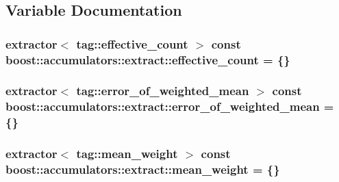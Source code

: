 \subsection{Variable Documentation}
\hypertarget{namespaceboost_1_1accumulators_1_1extract_a3053aac83dc8752f96916fe5b8d4ce31}{
\subsubsection[{effective\-\_\-count}]{\setlength{\rightskip}{0pt plus 5cm}extractor$<$ {\bf tag\-::effective\-\_\-count} $>$ const boost\-::accumulators\-::extract\-::effective\-\_\-count = \{\}}}\label{namespaceboost_1_1accumulators_1_1extract_a3053aac83dc8752f96916fe5b8d4ce31}
\hypertarget{namespaceboost_1_1accumulators_1_1extract_aa736c1893587667ab411a7d91493e2a5}{
\subsubsection[{error\-\_\-of\-\_\-weighted\-\_\-mean}]{\setlength{\rightskip}{0pt plus 5cm}extractor$<$ {\bf tag\-::error\-\_\-of\-\_\-weighted\-\_\-mean} $>$ const boost\-::accumulators\-::extract\-::error\-\_\-of\-\_\-weighted\-\_\-mean = \{\}}}\label{namespaceboost_1_1accumulators_1_1extract_aa736c1893587667ab411a7d91493e2a5}
\hypertarget{namespaceboost_1_1accumulators_1_1extract_aece73c78440e8b94bdcb26286cf53d99}{
\subsubsection[{mean\-\_\-weight}]{\setlength{\rightskip}{0pt plus 5cm}extractor$<$ {\bf tag\-::mean\-\_\-weight} $>$ const boost\-::accumulators\-::extract\-::mean\-\_\-weight = \{\}}}\label{namespaceboost_1_1accumulators_1_1extract_aece73c78440e8b94bdcb26286cf53d99}
